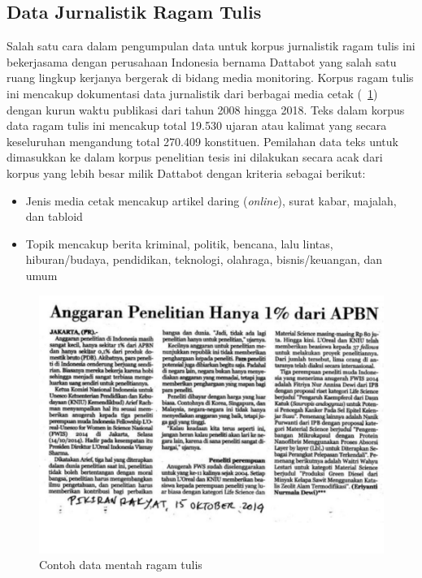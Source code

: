 \subsection{Data Jurnalistik Ragam Tulis}
Salah satu cara dalam pengumpulan data untuk korpus jurnalistik ragam tulis ini bekerjasama dengan perusahaan Indonesia bernama Dattabot yang salah satu ruang lingkup kerjanya bergerak di bidang media monitoring. Korpus ragam tulis ini mencakup dokumentasi data jurnalistik dari berbagai media cetak (\pic~\ref{fig:contoh-tulis-mentah}) dengan kurun waktu publikasi dari tahun 2008 hingga 2018. Teks dalam korpus data ragam tulis ini mencakup total 19.530 ujaran atau kalimat yang secara keseluruhan mengandung total 270.409 konstituen. Pemilahan data teks untuk dimasukkan ke dalam korpus penelitian tesis ini dilakukan secara acak dari korpus yang lebih besar milik Dattabot dengan kriteria sebagai berikut:

\begin{itemize}
	\item Jenis media cetak mencakup artikel daring (\textit{online}), surat kabar, majalah, dan tabloid
	\item Topik mencakup berita kriminal, politik, bencana, lalu lintas, hiburan/budaya, pendidikan, teknologi, olahraga, bisnis/keuangan, dan umum
\end{itemize}

\begin{figure}
	\centering \includegraphics[width=1
	\textwidth] {pics/contoh-tulis-mentah.png} \caption{Contoh data mentah ragam tulis} 
\label{fig:contoh-tulis-mentah} 
\end{figure}


